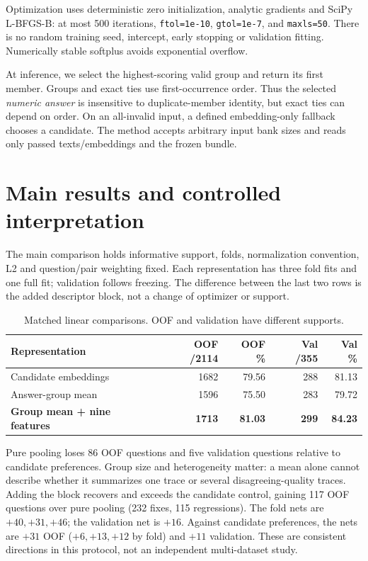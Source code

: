 \documentclass[11pt,a4paper]{article}
\newcommand{\code}[1]{\texttt{\small #1}}
\newcommand{\pageheading}[1]{\section{#1}}
\begin{document}
Optimization uses deterministic zero initialization, analytic gradients and
SciPy L-BFGS-B: at most 500 iterations, \code{ftol=1e-10}, \code{gtol=1e-7},
and \code{maxls=50}. There is no random training seed, intercept, early stopping
or validation fitting. Numerically stable softplus avoids exponential overflow.

At inference, we select the highest-scoring valid group and return its first
member. Groups and exact ties use first-occurrence order. Thus the selected
\emph{numeric answer} is insensitive to duplicate-member identity, but exact
ties can depend on order. On an all-invalid input, a defined embedding-only
fallback chooses a candidate. The method accepts arbitrary input bank sizes
and reads only passed texts/embeddings and the frozen bundle.

\newpage
\pageheading{Main results and controlled interpretation}
The main comparison holds informative support, folds, normalization convention,
L2 and question/pair weighting fixed. Each representation has three fold fits
and one full fit; validation follows freezing. The difference between the last
two rows is the added descriptor block, not a change of optimizer or support.

\begin{table}[h]\centering
\caption{Matched linear comparisons. OOF and validation have different supports.}
\begin{tabular}{lrrrr}\toprule
Representation & OOF /2114 & OOF \% & Val /355 & Val \% \\\midrule
Candidate embeddings & 1682 & 79.56 & 288 & 81.13 \\
Answer-group mean & 1596 & 75.50 & 283 & 79.72 \\
\textbf{Group mean + nine features} & \textbf{1713} & \textbf{81.03} & \textbf{299} & \textbf{84.23} \\
\bottomrule\end{tabular}
\end{table}

Pure pooling loses 86 OOF questions and five validation questions relative to
candidate preferences. Group size and heterogeneity matter: a mean alone cannot
describe whether it summarizes one trace or several disagreeing-quality traces.
Adding the block recovers and exceeds the candidate control, gaining 117 OOF
questions over pure pooling (232 fixes, 115 regressions). The fold nets are
$+40,+31,+46$; the validation net is $+16$. Against candidate preferences, the
nets are $+31$ OOF ($+6,+13,+12$ by fold) and $+11$ validation. These are
consistent directions in this protocol, not an independent multi-dataset study.
\end{document}
